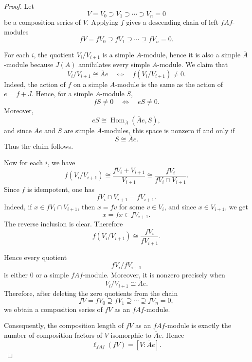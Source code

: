 \begin{proof}
    Let
    \[
        V=V_0\supset V_1\supset \cdots \supset V_n=0
    \]
    be a composition series of \(V\). Applying \(f\) gives a descending chain of
    left \(fAf\)-modules
    \[
        fV=fV_0\supseteq fV_1\supseteq \cdots \supseteq fV_n=0.
    \]

    For each \(i\), the quotient \(V_i/V_{i+1}\) is a simple \(A\)-module, hence it is also
    a simple \(\overline{A}\)-module because \(J(A)\) annihilates every simple
    \(A\)-module. We claim that
    \[
        V_i/V_{i+1}\cong \overline{A}e
        \quad\Longleftrightarrow\quad
        f(V_i/V_{i+1})\neq 0.
    \]
    Indeed, the action of \(f\) on a simple \(A\)-module is the same as the action of
    \(e=f+J\). Hence, for a simple \(A\)-module \(S\),
    \[
        fS\neq 0
        \quad\Longleftrightarrow\quad
        eS\neq 0.
    \]
    Moreover,
    \[
        eS\cong \operatorname{Hom}_{\overline{A}}(\overline{A}e,S),
    \]
    and since \(\overline{A}e\) and \(S\) are simple \(\overline{A}\)-modules, this space is
    nonzero if and only if
    \[
        S\cong \overline{A}e.
    \]
    Thus the claim follows.

    Now for each \(i\), we have
    \[
        f(V_i/V_{i+1})
        \cong
        \frac{fV_i+V_{i+1}}{V_{i+1}}
        \cong
        \frac{fV_i}{fV_i\cap V_{i+1}}.
    \]
    Since \(f\) is idempotent, one has
    \[
        fV_i\cap V_{i+1}=fV_{i+1}.
    \]
    Indeed, if \(x\in fV_i\cap V_{i+1}\), then \(x=fv\) for some \(v\in V_i\), and since
    \(x\in V_{i+1}\), we get
    \[
        x=fx\in fV_{i+1}.
    \]
    The reverse inclusion is clear. Therefore
    \[
        f(V_i/V_{i+1})
        \cong
        \frac{fV_i}{fV_{i+1}}.
    \]

    Hence every quotient
    \[
        fV_i/fV_{i+1}
    \]
    is either \(0\) or a simple \(fAf\)-module. Moreover, it is nonzero precisely when
    \[
        V_i/V_{i+1}\cong \overline{A}e.
    \]
    Therefore, after deleting the zero quotients from the chain
    \[
        fV=fV_0\supseteq fV_1\supseteq \cdots \supseteq fV_n=0,
    \]
    we obtain a composition series of \(fV\) as an \(fAf\)-module.

    Consequently, the composition length of \(fV\) as an \(fAf\)-module is exactly the
    number of composition factors of \(V\) isomorphic to \(\overline{A}e\). Hence
    \[
        \ell_{fAf}(fV)=[V:\overline{A}e].
    \]
\end{proof}

